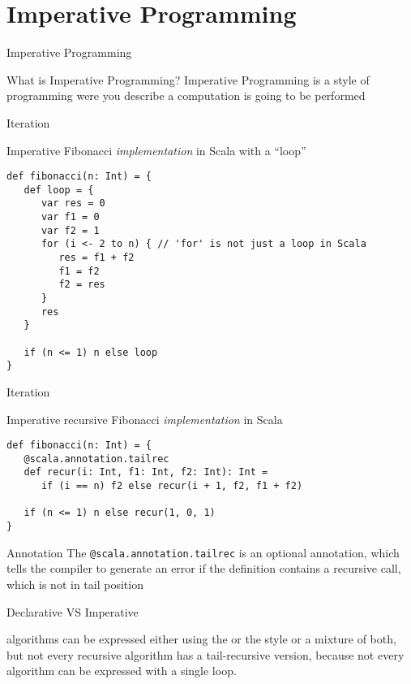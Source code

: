 \section{Imperative Programming}
\begin{frame}{Imperative Programming}
\begin{block}{What is Imperative Programming?}
\pause
Imperative Programming is a style of programming were you describe
 a computation is going to be performed
\end{block}
\end{frame}

\begin{frame}[fragile]{Iteration}
\begin{exampleblock}{Imperative Fibonacci \emph{implementation} in
Scala with a ``loop''}
\begin{lstlisting}
def fibonacci(n: Int) = {
   def loop = {
      var res = 0
      var f1 = 0
      var f2 = 1
      for (i <- 2 to n) { // 'for' is not just a loop in Scala
         res = f1 + f2
         f1 = f2
         f2 = res
      }
      res
   }

   if (n <= 1) n else loop
}
\end{lstlisting}
\end{exampleblock}
\end{frame}

\begin{frame}[fragile]{Iteration}
\begin{exampleblock}{Imperative recursive Fibonacci \emph{implementation} in
Scala}
\begin{lstlisting}
def fibonacci(n: Int) = {
   @scala.annotation.tailrec
   def recur(i: Int, f1: Int, f2: Int): Int =
      if (i == n) f2 else recur(i + 1, f2, f1 + f2)

   if (n <= 1) n else recur(1, 0, 1)
}
\end{lstlisting}
\end{exampleblock}
\pause
\begin{block}{Annotation}
The \lstinline!@scala.annotation.tailrec! is an optional annotation, which tells
the compiler to generate an \alert{error} if the definition contains a recursive call, which is
not in tail position
\end{block}
\end{frame}

\begin{frame}{Declarative VS Imperative}
\begin{center}
 algorithms can be expressed either using the
 or the  style or a mixture of
both, but not every recursive algorithm has a tail-recursive version, because
not every algorithm can be expressed with a single loop.
\end{center}
\end{frame}

